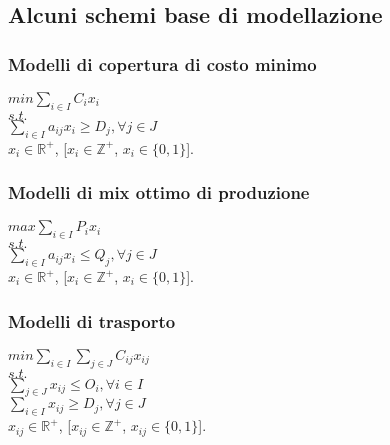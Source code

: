     \subsection{Alcuni schemi base di modellazione}
        \subsubsection{Modelli di copertura di costo minimo}
            $min \sum_{i\in I} C_i x_i$ \\
            $s.t.$ \\
            $\sum_{i\in I} a_{ij} x_i \geq D_j, \forall j \in J$ \\
            $x_i \in \mathbb{R}^+$, [$x_i \in \mathbb{Z}^+$, $x_i \in \{0, 1\}$].

        \subsubsection{Modelli di mix ottimo di produzione}
            $max \sum_{i\in I} P_i x_i$ \\
            $s.t.$ \\
            $\sum_{i\in I} a_{ij} x_i \leq Q_j, \forall j \in J$ \\
            $x_i \in \mathbb{R}^+$, [$x_i \in \mathbb{Z}^+$, $x_i \in \{0, 1\}$].   

        \subsubsection{Modelli di trasporto}
            $min \sum_{i\in I} \sum_{j\in J} C_{ij} x_{ij}$ \\
            $s.t.$ \\
            $\sum_{j\in J} x_{ij} \leq O_i, \forall i \in I$ \\
            $\sum_{i\in I} x_{ij} \geq D_j, \forall j \in J$ \\
            $x_{ij} \in \mathbb{R}^+$, [$x_{ij} \in \mathbb{Z}^+$, $x_{ij} \in \{0, 1\}$].


